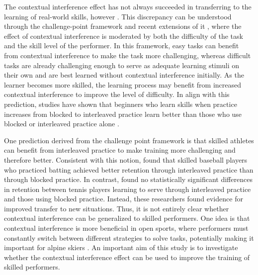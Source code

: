 The contextual interference effect has not always succeeded in transferring to the learning of real-world skills, however \cite{wulf_principles_2002, brady_theoretical_1998, barreiros_contextual_2007, AMMAR2023100537, guadagnoli_challenge_2004}. This discrepancy can be understood through the challenge-point framework \cite{guadagnoli_challenge_2004} and recent extensions of it \cite{hodges_extended_2022}, where the effect of contextual interference is moderated by both the difficulty of the task and the skill level of the performer. In this framework, easy tasks can benefit from contextual interference to make the task more challenging, whereas difficult tasks are already challenging enough to serve as adequate learning stimuli on their own and are best learned without contextual interference initially. As the learner becomes more skilled, the learning process may benefit from increased contextual interference to improve the level of difficulty. In align with this prediction, studies have shown that beginners who learn skills when practice increases from blocked to interleaved practice learn better than those who use blocked or interleaved practice alone \cite{porter_systematically_2010, saemi_practicing_2012}. 

One prediction derived from the challenge point framework is that skilled athletes can benefit from interleaved practice to make training more challenging and therefore better. Consistent with this notion, \cite{hall_contextual_1994} found that skilled baseball players who practiced batting achieved better retention through interleaved practice than through blocked practice. In contrast, \cite{buszard_quantifying_2017} found no statistically significant differences in retention between tennis players learning to serve through interleaved practice and those using blocked practice. Instead, these researchers found evidence for improved transfer to new situations. Thus, it is not entirely clear whether contextual interference can be generalized to skilled performers. One idea is that contextual interference is more beneficial in open sports, where performers must constantly switch between different strategies to solve tasks, potentially making it important for alpine skiers \cite{farrow_chapter_2017, buszard_quantifying_2017}. An important aim of this study is to investigate whether the contextual interference effect can be used to improve the training of skilled performers. 

